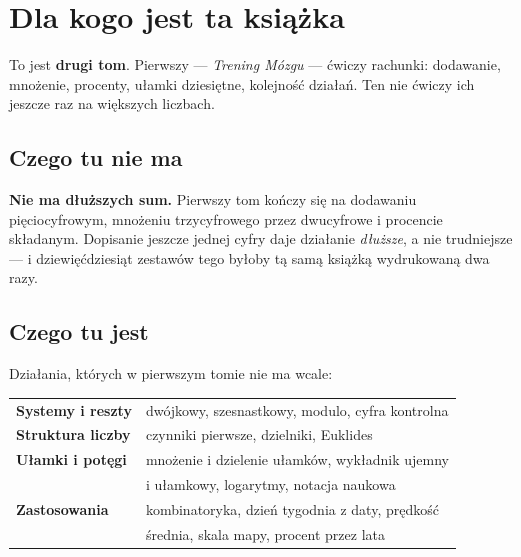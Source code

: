 %

\chapter*{Dla kogo jest ta książka}

To jest \textbf{drugi tom}. Pierwszy — \emph{Trening Mózgu} — ćwiczy rachunki:
dodawanie, mnożenie, procenty, ułamki dziesiętne, kolejność działań. Ten nie
ćwiczy ich jeszcze raz na większych liczbach.

\section*{Czego tu nie ma}

\textbf{Nie ma dłuższych sum.} Pierwszy tom kończy się na dodawaniu
pięciocyfrowym, mnożeniu trzycyfrowego przez dwucyfrowe i procencie składanym.
Dopisanie jeszcze jednej cyfry daje działanie \emph{dłuższe}, a nie
trudniejsze — i dziewięćdziesiąt zestawów tego byłoby tą samą książką
wydrukowaną dwa razy.

\section*{Czego tu jest}

Działania, których w pierwszym tomie nie ma wcale:

\begin{center}
  \begin{tabular}{@{}ll@{}}
    \textbf{Systemy i reszty} & dwójkowy, szesnastkowy, modulo, cyfra kontrolna \\[3pt]
    \textbf{Struktura liczby} & czynniki pierwsze, dzielniki, Euklides \\[3pt]
    \textbf{Ułamki i potęgi} & mnożenie i dzielenie ułamków, wykładnik ujemny \\
                             & i ułamkowy, logarytmy, notacja naukowa \\[3pt]
    \textbf{Zastosowania}    & kombinatoryka, dzień tygodnia z daty, prędkość \\
                             & średnia, skala mapy, procent przez lata \\
  \end{tabular}
\end{center}

